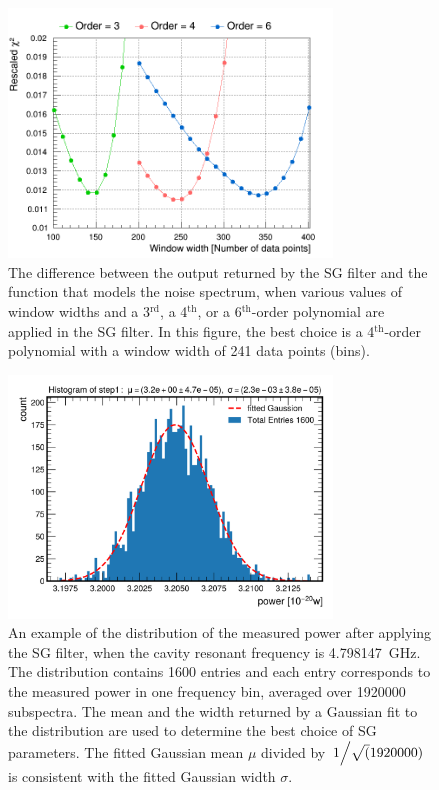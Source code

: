 \begin{figure} [htbp]
  \centering
  \includegraphics[width=8.6cm]{figures/chi2_Different_Order_Window_SGFilter.png}
  \caption{The difference between the output returned by the SG filter 
  and the function that models the noise spectrum, when various values of 
  window widths and 
  a 3$^\text{rd}$, a 4$^\text{th}$, or a 
  6$^\text{th}$-order polynomial are applied in the SG filter. In this 
  figure, the best choice is a 4$^\text{th}$-order polynomial with 
  a window width of 241 data points (bins). }
  \label{fig:sgoptimize}
\end{figure}
 


\begin{figure} [htbp]
  \centering
  \includegraphics[width=8.6cm]{figures/sysSG_temphistogram.png}
  \caption{An example of the distribution of the measured power after 
applying the SG filter, when 
the cavity resonant frequency is 4.798147~GHz. The distribution contains 
1600 entries and each entry corresponds to the measured power 
in one frequency bin, averaged
over 1920000 subspectra. The mean and the width returned by 
a Gaussian fit to the distribution are used to determine the best choice of 
SG parameters. The fitted Gaussian mean $\mu$ divided by 
$\left.1\middle/\sqrt(1920000)\right.$ is consistent 
with the fitted Gaussian width $\sigma$. 
}
  \label{fig:noisegauss}
\end{figure}
 

